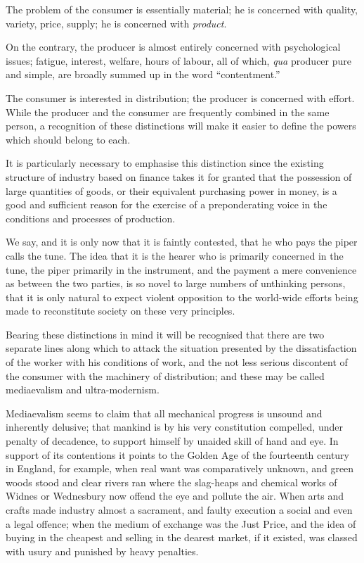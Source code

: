\documentclass{book}
\begin{document}
The problem of the consumer is essentially material; he is concerned with quality, variety, price, supply; he is concerned with \emph{product}.

On the contrary, the producer is almost entirely concerned with psychological issues; fatigue, interest, welfare, hours of labour, all of which, \emph{qua} producer pure and simple, are broadly summed up in the word “contentment.”

The consumer is interested in distribution; the producer is concerned with effort. While the producer and the consumer are frequently combined in the same person, a recognition of these distinctions will make it easier to define the powers which should belong to each.

It is particularly necessary to emphasise this distinction since the existing structure of industry based on finance takes it for granted that the possession of large quantities of goods, or their equivalent purchasing power in money, is a good and sufficient reason for the exercise of a preponderating voice in the conditions and processes of production.

We say, and it is only now that it is faintly contested, that he who pays the piper calls the tune. The idea that it is the hearer who is primarily concerned in the tune, the piper primarily in the instrument, and the payment a mere convenience as between the two parties, is so novel to large numbers of unthinking persons, that it is only natural to expect violent opposition to the world-wide efforts being made to reconstitute society on these very principles.

Bearing these distinctions in mind it will be recognised that there are two separate lines along which to attack the situation presented by the dissatisfaction of the worker with his conditions of work, and the not less serious discontent of the consumer with the machinery of distribution; and these may be called mediaevalism and ultra-modernism.

Mediaevalism seems to claim that all mechanical progress is unsound and inherently delusive; that mankind is by his very constitution compelled, under penalty of decadence, to support himself by unaided skill of hand and eye. In support of its contentions it points to the Golden Age of the fourteenth century in England, for example, when real want was comparatively unknown, and green woods stood and clear rivers ran where the slag-heaps and chemical works of Widnes or Wednesbury now offend the eye and pollute the air. When arts and crafts made industry almost a sacrament, and faulty execution a social and even a legal offence; when the medium of exchange was the Just Price, and the idea of buying in the cheapest and selling in the dearest market, if it existed, was classed with usury and punished by heavy penalties.
\end{document}

